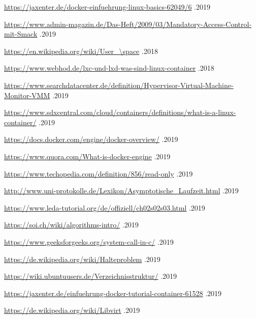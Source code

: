 \documentclass[10pt]{article}
\begin{document}
\begin{thebibliography}{999}
	 \url{https://jaxenter.de/docker-einfuehrung-linux-basics-62049/6} .2019

	 \url{https://www.admin-magazin.de/Das-Heft/2009/03/Mandatory-Access-Control-mit-Smack} .2019

	\url{https://en.wikipedia.org/wiki/User_\space} .2018 %

	 \url{https://www.webhod.de/lxc-und-lxd-was-sind-linux-container} .2018 

	\url{https://www.searchdatacenter.de/definition/Hypervisor-Virtual-Machine-Monitor-VMM} .2019

	\url{https://www.sdxcentral.com/cloud/containers/definitions/what-is-a-linux-container/} .2019

	\url{https://docs.docker.com/engine/docker-overview/} .2019

	\url{https://www.quora.com/What-is-docker-engine} .2019



	\url{https://www.techopedia.com/definition/856/read-only} .2019

	\url{http://www.uni-protokolle.de/Lexikon/Asymptotische_Laufzeit.html} .2019
	

	\url{https://www.leda-tutorial.org/de/offiziell/ch02s02s03.html} .2019
	
	\url{https://soi.ch/wiki/algorithms-intro/} .2019

	\url{https://www.geeksforgeeks.org/system-call-in-c/} .2019
	
	\url{https://de.wikipedia.org/wiki/Halteproblem} .2019
	
	\url{https://wiki.ubuntuusers.de/Verzeichnisstruktur/} .2019
	
	\url{https://jaxenter.de/einfuehrung-docker-tutorial-container-61528} .2019	

	\url{https://de.wikipedia.org/wiki/Libvirt} .2019	
\end{thebibliography}
\end{document}
